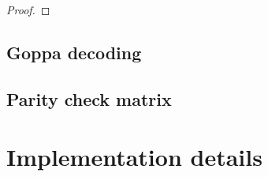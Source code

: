 \documentclass{article}
\begin{document}
\begin{proof}
\end{proof}

\subsection{Goppa decoding}

\subsection{Parity check matrix}

\section{Implementation details}



\end{document}
